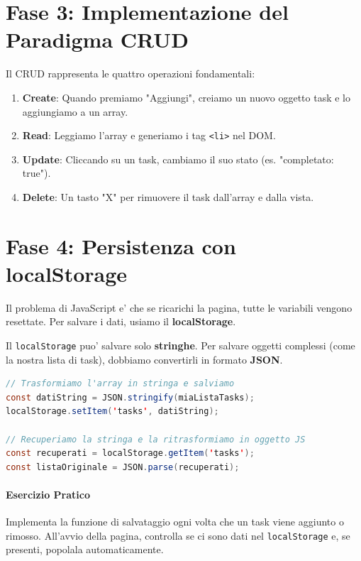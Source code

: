\documentclass[11pt,a4paper]{report}
\begin{document}
\section{Fase 3: Implementazione del Paradigma CRUD}
Il CRUD rappresenta le quattro operazioni fondamentali:
\begin{enumerate}
    \item \textbf{Create}: Quando premiamo "Aggiungi", creiamo un nuovo oggetto task e lo aggiungiamo a un array.
    \item \textbf{Read}: Leggiamo l'array e generiamo i tag \texttt{<li>} nel DOM.
    \item \textbf{Update}: Cliccando su un task, cambiamo il suo stato (es. "completato: true").
    \item \textbf{Delete}: Un tasto "X" per rimuovere il task dall'array e dalla vista.
\end{enumerate}

\section{Fase 4: Persistenza con localStorage}
Il problema di JavaScript e' che se ricarichi la pagina, tutte le variabili vengono resettate. Per salvare i dati, usiamo il \textbf{localStorage}.

Il \texttt{localStorage} puo' salvare solo \textbf{stringhe}. Per salvare oggetti complessi (come la nostra lista di task), dobbiamo convertirli in formato \textbf{JSON}.

\begin{lstlisting}[language=Java, caption=Salvataggio e Caricamento dati]
// Trasformiamo l'array in stringa e salviamo
const datiString = JSON.stringify(miaListaTasks);
localStorage.setItem('tasks', datiString);

// Recuperiamo la stringa e la ritrasformiamo in oggetto JS
const recuperati = localStorage.getItem('tasks');
const listaOriginale = JSON.parse(recuperati);
\end{lstlisting}

\paragraph{Esercizio Pratico}
Implementa la funzione di salvataggio ogni volta che un task viene aggiunto o rimosso. All'avvio della pagina, controlla se ci sono dati nel \texttt{localStorage} e, se presenti, popolala automaticamente.
\end{document}
